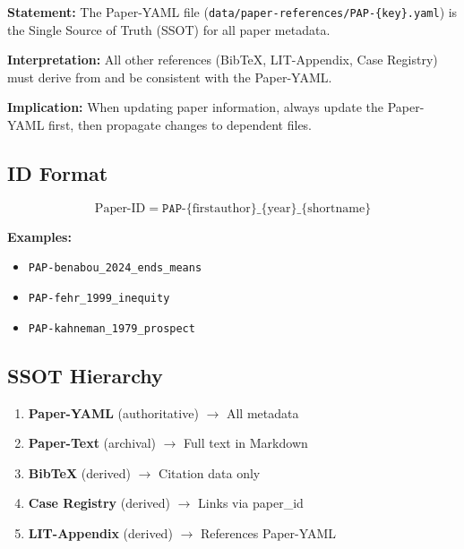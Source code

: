 \begin{tcolorbox}[colback=gray!5!white, colframe=gray!75!black,
    title=Axiom PINT-3: ATOMIC ID RULE]
\textbf{Statement:} The Paper-YAML file (\texttt{data/paper-references/PAP-\{key\}.yaml})
is the Single Source of Truth (SSOT) for all paper metadata.

\textbf{Interpretation:} All other references (BibTeX, LIT-Appendix, Case Registry)
must derive from and be consistent with the Paper-YAML.

\textbf{Implication:} When updating paper information, always update the
Paper-YAML first, then propagate changes to dependent files.
\end{tcolorbox}

\subsection{ID Format}

\begin{equation}
\text{Paper-ID} = \texttt{PAP-}\{\text{firstauthor}\}\_\{\text{year}\}\_\{\text{shortname}\}
\end{equation}

\textbf{Examples:}
\begin{itemize}[nosep]
\item \texttt{PAP-benabou\_2024\_ends\_means}
\item \texttt{PAP-fehr\_1999\_inequity}
\item \texttt{PAP-kahneman\_1979\_prospect}
\end{itemize}

\subsection{SSOT Hierarchy}

\begin{enumerate}
\item \textbf{Paper-YAML} (authoritative) $\rightarrow$ All metadata
\item \textbf{Paper-Text} (archival) $\rightarrow$ Full text in Markdown
\item \textbf{BibTeX} (derived) $\rightarrow$ Citation data only
\item \textbf{Case Registry} (derived) $\rightarrow$ Links via paper\_id
\item \textbf{LIT-Appendix} (derived) $\rightarrow$ References Paper-YAML
\end{enumerate}


